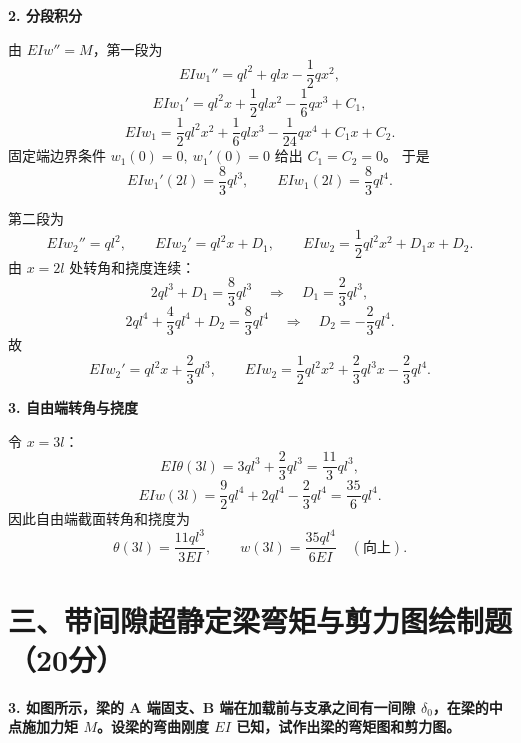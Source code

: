 \documentclass[11pt,a4paper]{ctexrep}
\begin{document}
{\textbf{2. 分段积分}

由 $EIw''=M$，第一段为
\[
EIw_1''=ql^2+qlx-\frac{1}{2}qx^2,
\]
\[
EIw_1'=ql^2x+\frac{1}{2}qlx^2-\frac{1}{6}qx^3+C_1,
\]
\[
EIw_1=\frac{1}{2}ql^2x^2+\frac{1}{6}qlx^3-\frac{1}{24}qx^4+C_1x+C_2.
\]
固定端边界条件 $w_1(0)=0,\ w_1'(0)=0$ 给出 $C_1=C_2=0$。
于是
\[
EIw_1'(2l)=\frac{8}{3}ql^3,\qquad EIw_1(2l)=\frac{8}{3}ql^4.
\]

第二段为
\[
EIw_2''=ql^2,\qquad EIw_2'=ql^2x+D_1,\qquad
EIw_2=\frac{1}{2}ql^2x^2+D_1x+D_2.
\]
由 $x=2l$ 处转角和挠度连续：
\[
2ql^3+D_1=\frac{8}{3}ql^3\quad\Rightarrow\quad D_1=\frac{2}{3}ql^3,
\]
\[
2ql^4+\frac{4}{3}ql^4+D_2=\frac{8}{3}ql^4\quad\Rightarrow\quad D_2=-\frac{2}{3}ql^4.
\]
故
\[
EIw_2'=ql^2x+\frac{2}{3}ql^3,\qquad
EIw_2=\frac{1}{2}ql^2x^2+\frac{2}{3}ql^3x-\frac{2}{3}ql^4.
\]

\textbf{3. 自由端转角与挠度}

令 $x=3l$：
\[
EI\theta(3l)=3ql^3+\frac{2}{3}ql^3=\frac{11}{3}ql^3,
\]
\[
EIw(3l)=\frac{9}{2}ql^4+2ql^4-\frac{2}{3}ql^4=\frac{35}{6}ql^4.
\]
因此自由端截面转角和挠度为
\[
\theta(3l)=\frac{11ql^3}{3EI},\qquad
w(3l)=\frac{35ql^4}{6EI}\quad(\text{向上}).
\]




\section*{三、带间隙超静定梁弯矩与剪力图绘制题（20分）}

\textbf{3. 如图所示，梁的 A 端固支、B 端在加载前与支承之间有一间隙 $\delta_0$，在梁的中点施加力矩 $M$。设梁的弯曲刚度 $EI$ 已知，试作出梁的弯矩图和剪力图。}

\centering
{}}
\end{document}
